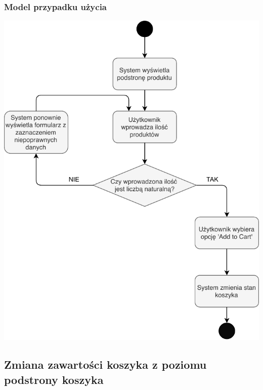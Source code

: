 \documentclass[12pt]{report}
\begin{document}
	\subsubsection{Model przypadku użycia}
	\begin{center}
		\includegraphics[width=400pt]{koszyk1.pdf}
	\end{center}
		
		
	\subsection{Zmiana zawartości koszyka z poziomu podstrony koszyka}
\end{document}
